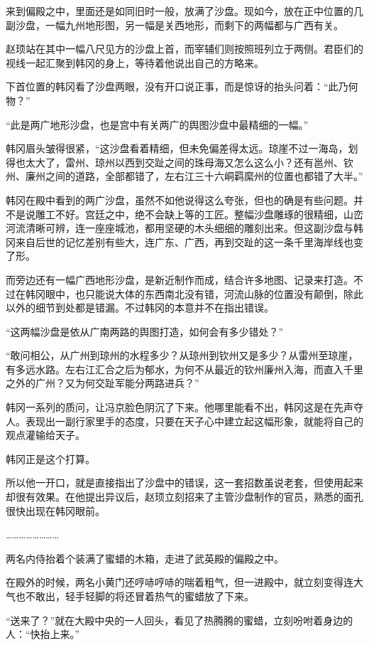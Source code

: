 来到偏殿之中，里面还是如同旧时一般，放满了沙盘。现如今，放在正中位置的几副沙盘，一幅九州地形图，另一幅是关西地形，而剩下的两幅都与广西有关。

赵顼站在其中一幅八尺见方的沙盘上首，而宰辅们则按照班列立于两侧。君臣们的视线一起汇聚到韩冈的身上，等待着他说出自己的方略来。

下首位置的韩冈看了沙盘两眼，没有开口说正事，而是惊讶的抬头问着：“此乃何物？”

“此是两广地形沙盘，也是宫中有关两广的舆图沙盘中最精细的一幅。”

韩冈眉头皱得很紧，“这沙盘看着精细，但未免偏差得太远。琼崖不过一海岛，划得也太大了，雷州、琼州以西到交趾之间的珠母海又怎么这么小？还有邕州、钦州、廉州之间的道路，全部都错了，左右江三十六峒羁縻州的位置也都错了大半。”

韩冈在殿中看到的两广沙盘，虽然不如他说得这么夸张，但也的确是有些问题。并不是说雕工不好。宫廷之中，绝不会缺上等的工匠。整幅沙盘雕琢的很精细，山峦河流清晰可辨，连一座座城池，都用坚硬的木头细细的雕刻出来。但这副沙盘与韩冈来自后世的记忆差别有些大，连广东、广西，再到交趾的这一条千里海岸线也变了形。

而旁边还有一幅广西地形沙盘，是新近制作而成，结合许多地图、记录来打造。不过在韩冈眼中，也只能说大体的东西南北没有错，河流山脉的位置没有颠倒，除此以外的细节到处都是错漏。不过韩冈的本意并不在指出错误。

“这两幅沙盘是依从广南两路的舆图打造，如何会有多少错处？”

“敢问相公，从广州到琼州的水程多少？从琼州到钦州又是多少？从雷州至琼崖，有多远水路。左右江汇合之后为郁水，为何不从最近的钦州廉州入海，而直入千里之外的广州？又为何交趾军能分两路进兵？”

韩冈一系列的质问，让冯京脸色阴沉了下来。他哪里能看不出，韩冈这是在先声夺人。表现出一副行家里手的态度，只要在天子心中建立起这幅形象，就能将自己的观点灌输给天子。

韩冈正是这个打算。

所以他一开口，就是直接指出了沙盘中的错误，这一套招数虽说老套，但使用起来却很有效果。在他提出异议后，赵顼立刻招来了主管沙盘制作的官员，熟悉的面孔很快出现在韩冈眼前。

……………………

两名内侍抬着个装满了蜜蜡的木箱，走进了武英殿的偏殿之中。

在殿外的时候，两名小黄门还哼哧哼哧的喘着粗气，但一进殿中，就立刻变得连大气也不敢出，轻手轻脚的将还冒着热气的蜜蜡放了下来。

“送来了？”就在大殿中央的一人回头，看见了热腾腾的蜜蜡，立刻吩咐着身边的人：“快抬上来。”

